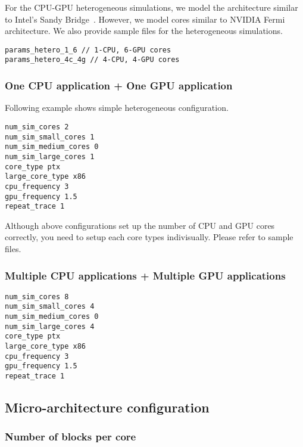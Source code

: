 For the CPU-GPU heterogeneous simulations, we model the architecture
similar to Intel's Sandy Bridge~\cite{sandybridge}. However, we
model \gpu cores similar to NVIDIA Fermi~\cite{fermi} architecture. We
also provide sample files for the heterogeneous simulations.

\smallskip
\begin{lstlisting}
params_hetero_1_6 // 1-CPU, 6-GPU cores
params_hetero_4c_4g // 4-CPU, 4-GPU cores
\end{lstlisting}
\smallskip

\subsubsection{One CPU application + One GPU application}

Following example shows simple heterogeneous configuration.

\smallskip
\begin{lstlisting}
num_sim_cores 2
num_sim_small_cores 1
num_sim_medium_cores 0
num_sim_large_cores 1
core_type ptx
large_core_type x86
cpu_frequency 3
gpu_frequency 1.5
repeat_trace 1
\end{lstlisting}
\smallskip

Although above configurations set up the number of CPU and GPU cores
correctly, you need to setup each core types indivisually. Please
refer to sample files.

\subsubsection{Multiple CPU applications + Multiple GPU applications}

\smallskip
\begin{lstlisting}
num_sim_cores 8
num_sim_small_cores 4
num_sim_medium_cores 0
num_sim_large_cores 4
core_type ptx
large_core_type x86
cpu_frequency 3
gpu_frequency 1.5
repeat_trace 1
\end{lstlisting}
\smallskip


\subsection{Micro-architecture configuration}

\subsubsection{Number of blocks per core}

